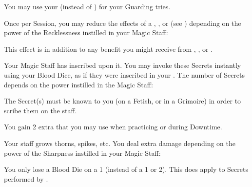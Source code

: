 You may use your \INT (instead of \DEX) for your Guarding tries.



Once per Session, you may reduce the effects of a , , or  (see ) depending on the power of the Recklessness instilled in your Magic Staff:


This effect is in addition to any benefit you might receive from  , , or .

\cbreak


Your Magic Staff has  inscribed upon it. You may invoke these Secrets instantly using your Blood Dice, as if they were inscribed in your . The number of Secrets depends on the power instilled in the Magic Staff:


The Secret(s) must be known to you (on a Fetish, or in a Grimoire) in order to scribe them on the staff.


You gain 2 extra  that you may use when practicing  or  during Downtime.


Your staff grows thorns, spikes, etc.  You deal extra damage depending on the power of the Sharpness instilled in your Magic Staff:




You only lose a Blood Die on a 1 (instead of a 1 or 2). This does  apply to Secrets performed by .
